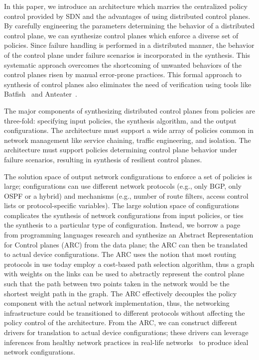 
In this paper, we introduce an architecture which marries the centralized
policy control provided by SDN and the advantages of using
distributed control planes. 
By carefully engineering the parameters determining the
behavior of a distributed control plane, 
we can synthesize control planes which
enforce a diverse set of policies. 
Since failure handling is 
performed in a distributed manner, the behavior of the control
plane under failure scenarios is incorporated in the synthesis. 
This systematic approach overcomes the shortcoming of unwanted
behaviors of the control planes risen by manual error-prone
practices. This
formal approach to synthesis of control planes also eliminates the need of 
verification using tools like Batfish~\cite{batfish} and Anteater~\cite{anteater}.

The major components of synthesizing distributed control planes from 
policies are three-fold: specifying input policies, the synthesis 
algorithm, and the output configurations. The architecture must 
support a wide array of policies common in network management like service
chaining, traffic engineering, and isolation. The architecture must
support policies determining control plane behavior under failure scenarios,
resulting in synthesis of resilient control planes. 

The solution space of output network configurations to enforce a set of policies
is large; configurations can use different 
network protocols (e.g., only BGP, only OSPF or a hybrid) and
mechanisms (e.g., number of route filters, access control lists
or protocol-specific variables). The large solution space
of configurations complicates the synthesis of
network configurations from
input policies, 
or ties the synthesis to a particular type of configuration. 
Instead, we borrow a page from programming languages
research and
synthesize an Abstract Representation for Control planes (ARC) from 
the data plane; the ARC can then be translated to actual device configurations.
The ARC uses the notion that most routing protocols in use 
today employ a cost-based path selection algorithm, thus a graph with
weights on the links can be used to abstractly represent the control plane such that 
the path between two points taken in the network would be 
the shortest weight path in the graph. 
The ARC effectively decouples the policy component with the 
actual network implementation, thus, the networking infrastructure could be
transitioned to different protocols without affecting the policy 
control of the architecture. From the ARC, we can construct different
drivers for translation to actual device configurations; these drivers
can leverage inferences from healthy network practices in 
real-life networks~\cite{mpa-imc15} to produce ideal network configurations.


